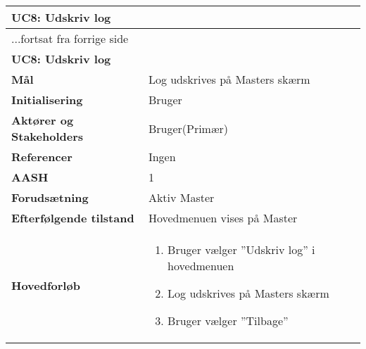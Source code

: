 \begin{center} \centering \label{UC8}
	\begin{longtable}{|p{5cm}|p{9cm}|}  %
	\hline
		\multicolumn{2}{|l|}{\textbf{UC8: Udskriv log}} \\\hline %
		\endfirsthead
		
		\multicolumn{2}{l}{...fortsat fra forrige side} \\ \hline %
		\multicolumn{2}{|l|}{\textbf{UC8: Udskriv log}} \\\hline %
		\endhead	
		
		\textbf{Mål}								&Log udskrives på Masters skærm	\\\hline
		\textbf{Initialisering}					&Bruger 					\\\hline
		\textbf{Aktører og Stakeholders}			&Bruger(Primær)			\\\hline
		\textbf{Referencer}						&Ingen					\\\hline
		\textbf{AASH}							&1						\\\hline
		\textbf{Forudsætning}					&Aktiv Master		\\\hline
		\textbf{Efterfølgende tilstand}			&Hovedmenuen vises på Master	\\\hline
		\textbf{Hovedforløb}					
			&\begin{enumerate}
	
				\item Bruger vælger ''Udskriv log'' i hovedmenuen 
				
				\item Log udskrives på Masters skærm
				
				\item Bruger vælger ''Tilbage''
	
			\end{enumerate}\\\hline
	\end{longtable} 
\end{center}

